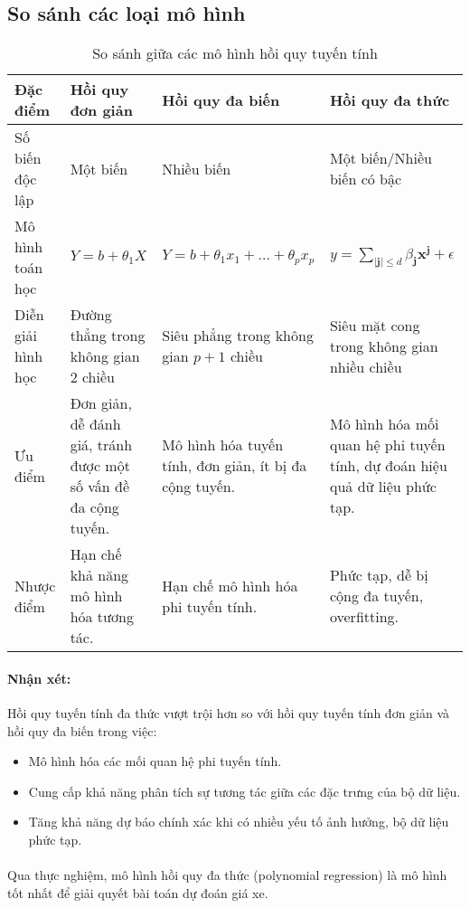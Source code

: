 \subsection{So sánh các loại mô hình}

\begin{table}[H]
\centering
\begin{tabular}{|p{2cm}|p{4cm}|p{5cm}|p{5cm}|}
\hline
\textbf{Đặc điểm} & \textbf{Hồi quy đơn giản} & \textbf{Hồi quy đa biến} & \textbf{Hồi quy đa thức} \\
\hline
Số biến độc lập & Một biến & Nhiều biến & Một biến/Nhiều biến có bậc \\
\hline
Mô hình toán học & $Y = b + \theta_1 X$ & $Y = b + \theta_1 x_1 + \dots + \theta_p x_p$ & $
y = \sum_{|\mathbf{j}| \leq d} \beta_{\mathbf{j}} \mathbf{x}^{\mathbf{j}} + \epsilon
$\\
\hline
Diễn giải hình học & Đường thẳng trong không gian 2 chiều & Siêu phẳng trong không gian $p+1$ chiều & Siêu mặt cong trong không gian nhiều chiều \\
\hline
Ưu điểm & Đơn giản, dễ đánh giá, tránh được một số vấn đề đa cộng tuyến. & Mô hình hóa tuyến tính, đơn giản, ít bị đa cộng tuyến. & Mô hình hóa mối quan hệ phi tuyến tính, dự đoán hiệu quả dữ liệu phức tạp.\\
\hline
Nhược điểm & Hạn chế khả năng mô hình hóa tương tác. & Hạn chế mô hình hóa phi tuyến tính. & Phức tạp, dễ bị cộng đa tuyến, overfitting.\\
\hline
\end{tabular}
\caption{So sánh giữa các mô hình hồi quy tuyến tính}
\end{table}

\paragraph{Nhận xét:}{Hồi quy tuyến tính đa thức vượt trội hơn so với hồi quy tuyến tính đơn giản và hồi quy đa biến trong việc:}

\begin{itemize}
    \item Mô hình hóa các mối quan hệ phi tuyến tính.
    \item Cung cấp khả năng phân tích sự tương tác giữa các đặc trưng của bộ dữ liệu.
    \item Tăng khả năng dự báo chính xác khi có nhiều yếu tố ảnh hưởng, bộ dữ liệu phức tạp.
\end{itemize}

\paragraph{}{Qua thực nghiệm, mô hình hồi quy đa thức (polynomial regression) là mô hình tốt nhất để giải quyết bài toán dự đoán giá xe.}

\pagebreak